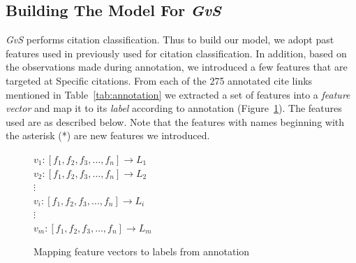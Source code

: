 \subsection*{Building The Model For {\it GvS}}
{\it GvS} performs citation classification. Thus to build our model, we adopt past features used in  previously used for citation classification. In addition, based on the observations made during annotation, we introduced a few features that are targeted at Specific citations. From each of the 275 annotated cite links mentioned in Table~\ref{tab:annotation} we extracted a set of features into a {\it feature vector} and map it to its {\it label} according to annotation (Figure~\ref{fig:featurevector}). The features used are as described below. Note that the features with names beginning with the asterisk (*) are new features we introduced.

\begin{figure}[h]
\centering
$v_1:[f_1, f_2, f_3, \ldots, f_n] \rightarrow L_1$ \\
$v_2:[f_1, f_2, f_3, \ldots, f_n] \rightarrow L_2$ \\
$\vdots$ \\
$v_i:[f_1, f_2, f_3, \ldots, f_n] \rightarrow L_i$ \\
$\vdots$ \\
$v_m:[f_1, f_2, f_3, \ldots, f_n] \rightarrow L_m$
\caption{Mapping feature vectors to labels from annotation}
\label{fig:featurevector}
\end{figure}

